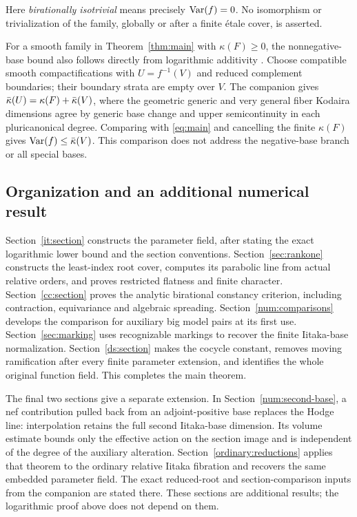 Here \emph{birationally isotrivial} means precisely $\operatorname{Var}(f)=0$.
No isomorphism or trivialization of the family, globally or after a
finite \'etale cover, is asserted.

For a smooth family in Theorem~\ref{thm:main} with $\kappa(F)\geq0$,
the nonnegative-base bound also follows directly from logarithmic
additivity \cite[Corollary~1.2]{AdditivityCompanion}. Choose compatible
smooth compactifications with $U=f^{-1}(V)$ and reduced complement
boundaries; their boundary strata are empty over $V$. The companion
gives $\bar\kappa(U)=\kappa(F)+\bar\kappa(V)$, where the geometric generic and
very general fiber Kodaira dimensions agree by generic base change and
upper semicontinuity in each pluricanonical degree. Comparing with
\eqref{eq:main} and cancelling the finite $\kappa(F)$ gives
$\operatorname{Var}(f)\leq\bar\kappa(V)$. This comparison
does not address the negative-base branch or all special bases.

\subsection{Organization and an additional numerical result}

Section~\ref{it:section} constructs the parameter field, after stating
the exact logarithmic lower bound and the section conventions.
Section~\ref{sec:rankone} constructs the least-index root cover,
computes its parabolic line from actual relative orders, and proves
restricted flatness and finite character.
Section~\ref{cc:section} proves the analytic birational constancy
criterion, including contraction, equivariance and algebraic spreading.
Section~\ref{num:comparisons} develops the comparison for auxiliary
big model pairs at its first use. Section~\ref{sec:marking} uses
recognizable markings to recover the finite Iitaka-base normalization.
Section~\ref{ds:section} makes the cocycle constant, removes moving
ramification after every finite parameter extension, and identifies
the whole original function field. This completes the main theorem.

The final two sections give a separate extension. In
Section~\ref{num:second-base}, a nef contribution pulled back from an
adjoint-positive base replaces the Hodge line: interpolation retains
the full second Iitaka-base dimension. Its volume estimate bounds only
the effective action on the section image and is independent of the
degree of the auxiliary alteration. Section~\ref{ordinary:reductions}
applies that theorem to the ordinary relative Iitaka fibration and
recovers the same embedded parameter field. The exact reduced-root
and section-comparison inputs from the companion are stated there.
These sections are additional results; the logarithmic proof above
does not depend on them.
